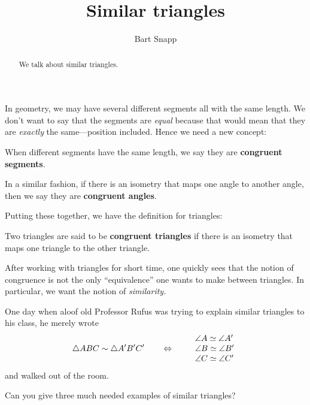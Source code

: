 \documentclass{ximera}
\title{Similar triangles}
\author{Bart Snapp}
\begin{document}
\begin{abstract}
  We talk about similar triangles.
\end{abstract}
\maketitle

In geometry, we may have several different segments all with the same
length. We don't want to say that the segments are \textit{equal}
because that would mean that they are \textit{exactly} the
same---position included. Hence we need a new concept:

\begin{definition}
When different segments have the same length, we say they are
\textbf{congruent segments}. 
\end{definition}

\begin{definition}
In a similar fashion, if there is an isometry that maps one angle to another angle, then we say they are \textbf{congruent angles}.
\end{definition}

Putting these together, we have the definition for triangles:

\begin{definition} 
Two triangles are said to be \textbf{congruent triangles} if there is
an isometry that maps one triangle to the other triangle.
\end{definition}


After working with triangles for short time, one quickly sees that the
notion of congruence is not the only ``equivalence'' one wants to
make between triangles. In particular, we want the notion of
\textit{similarity.} 

One day when aloof old Professor Rufus was trying to explain similar
triangles to his class, he merely wrote
\[
\triangle ABC \sim \triangle A'B'C' \qquad\Leftrightarrow \qquad\begin{array}{l}
\angle A \simeq \angle A'\\
\angle B \simeq \angle B' \\
\angle C \simeq \angle C'
\end{array}
\]
and walked out of the room.

\begin{question} 
Can you give three much needed examples of similar triangles? 
\end{question}
\end{document}
